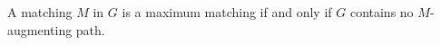 

\setcounter{section}{4}
\setcounter{subsection}{2}
\setcounter{dfn}{4}

\begin{thm}[Berge]
A matching $M$ in $G$ is a maximum matching if and only if $G$ contains no $M$-augmenting path.
\end{thm}



